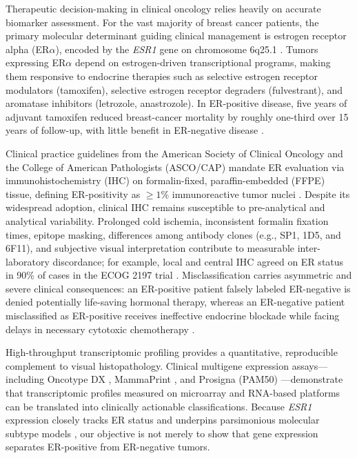\documentclass[11pt,a4paper]{article}
\begin{document}
Therapeutic decision-making in clinical oncology relies heavily on accurate biomarker assessment. For the vast majority of breast cancer patients, the primary molecular determinant guiding clinical management is estrogen receptor alpha (ER$\alpha$), encoded by the \textit{ESR1} gene on chromosome 6q25.1 \cite{r1}. Tumors expressing ER$\alpha$ depend on estrogen-driven transcriptional programs, making them responsive to endocrine therapies such as selective estrogen receptor modulators (tamoxifen), selective estrogen receptor degraders (fulvestrant), and aromatase inhibitors (letrozole, anastrozole). In ER-positive disease, five years of adjuvant tamoxifen reduced breast-cancer mortality by roughly one-third over 15 years of follow-up, with little benefit in ER-negative disease \cite{r2}.

Clinical practice guidelines from the American Society of Clinical Oncology and the College of American Pathologists (ASCO/CAP) mandate ER evaluation via immunohistochemistry (IHC) on formalin-fixed, paraffin-embedded (FFPE) tissue, defining ER-positivity as $\ge 1\%$ immunoreactive tumor nuclei \cite{r3}. Despite its widespread adoption, clinical IHC remains susceptible to pre-analytical and analytical variability. Prolonged cold ischemia, inconsistent formalin fixation times, epitope masking, differences among antibody clones (e.g., SP1, 1D5, and 6F11), and subjective visual interpretation contribute to measurable inter-laboratory discordance; for example, local and central IHC agreed on ER status in 90\% of cases in the ECOG 2197 trial \cite{r4}. Misclassification carries asymmetric and severe clinical consequences: an ER-positive patient falsely labeled ER-negative is denied potentially life-saving hormonal therapy, whereas an ER-negative patient misclassified as ER-positive receives ineffective endocrine blockade while facing delays in necessary cytotoxic chemotherapy \cite{r2,r3}.

High-throughput transcriptomic profiling provides a quantitative, reproducible complement to visual histopathology. Clinical multigene expression assays---including Oncotype DX \cite{r5}, MammaPrint \cite{r6}, and Prosigna (PAM50) \cite{r7}---demonstrate that transcriptomic profiles measured on microarray and RNA-based platforms can be translated into clinically actionable classifications. Because \textit{ESR1} expression closely tracks ER status and underpins parsimonious molecular subtype models \cite{r8}, our objective is not merely to show that gene expression separates ER-positive from ER-negative tumors.
\end{document}
